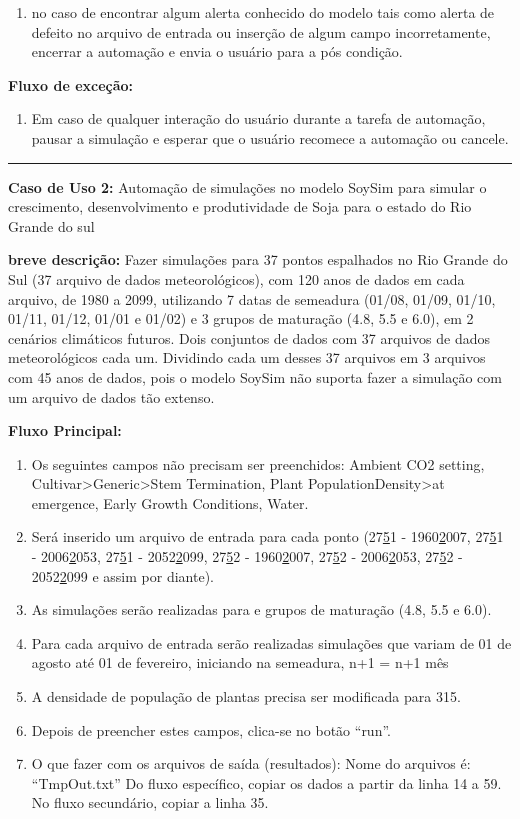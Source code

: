 \documentclass[12pt]{article}
\begin{document}
	\begin{enumerate}
		\item no caso de encontrar algum alerta conhecido do modelo tais como alerta de defeito no arquivo de entrada ou inserção de algum campo incorretamente, encerrar a automação e envia o usuário para a pós condição.
	\end{enumerate}
		
	{\bf Fluxo de exceção:}
	
	\begin{enumerate}
		\item Em caso de qualquer interação do usuário durante a tarefa de automação, pausar a simulação e esperar que o usuário recomece a automação ou cancele.
	\end{enumerate}
	
	\bigskip \hrule \bigskip
	
	
	{\bf Caso de Uso 2:} Automação de simulações no modelo SoySim para simular o crescimento, desenvolvimento e produtividade de Soja para o estado do Rio Grande do sul
	\bigskip
	
	{\bf breve descrição:} Fazer simulações para 37 pontos espalhados no Rio Grande do Sul (37 arquivo de dados meteorológicos), com 120 anos de dados em cada arquivo, de 1980 a 2099, utilizando 7 datas de semeadura (01/08, 01/09, 01/10, 01/11, 01/12, 01/01 e 01/02) e 3 grupos de maturação (4.8, 5.5 e 6.0), em 2 cenários climáticos futuros. Dois conjuntos de dados com 37 arquivos de dados meteorológicos cada um. Dividindo cada um desses 37 arquivos em 3 arquivos com 45 anos de dados, pois o modelo SoySim não suporta fazer a simulação com um arquivo de dados tão extenso.
	\bigskip
	
	{\bf Fluxo Principal:}
	
	\begin{enumerate}
		\item Os seguintes campos não precisam ser preenchidos: Ambient CO2 setting, Cultivar>Generic>Stem Termination, Plant PopulationDensity>at emergence, Early Growth Conditions, Water.
		\item Será inserido um arquivo de entrada para cada ponto (27\underline51 - 1960\underline2007, 27\underline51 - 2006\underline2053, 27\underline51 - 2052\underline2099, 27\underline52 - 1960\underline2007, 27\underline52 - 2006\underline2053, 27\underline52 - 2052\underline2099 e assim por diante).
		\item As simulações serão realizadas para e grupos de maturação (4.8, 5.5 e 6.0).
		\item Para cada arquivo de entrada serão realizadas simulações que variam de 01 de agosto até 01 de fevereiro, iniciando na semeadura, n+1 = n+1 mês
		\item A densidade de população de plantas precisa ser modificada para 315.
		\item Depois de preencher estes campos, clica-se no botão “run”.
		\item O que fazer com os arquivos de saída (resultados):
				Nome do arquivos é: “TmpOut.txt”
				Do fluxo específico, copiar os dados a partir da linha 14 a 59.
				No fluxo secundário, copiar a linha 35.
	\end{enumerate}
	
\end{document}
